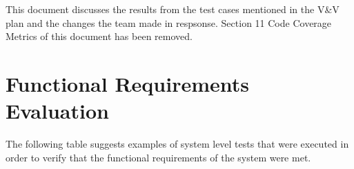 \documentclass[12pt, titlepage]{article}
\begin{document}

\newpage

\tableofcontents

\listoftables %

\listoffigures %

\newpage


This document discusses the results from the test cases mentioned in the V\&V plan and the changes the team made in respsonse. 
Section 11 Code Coverage Metrics of this document has been removed. 

\section{Functional Requirements Evaluation}

\noindent The following table suggests examples of system level tests that were executed in order to verify that the functional requirements of the system were met.
\end{document}
